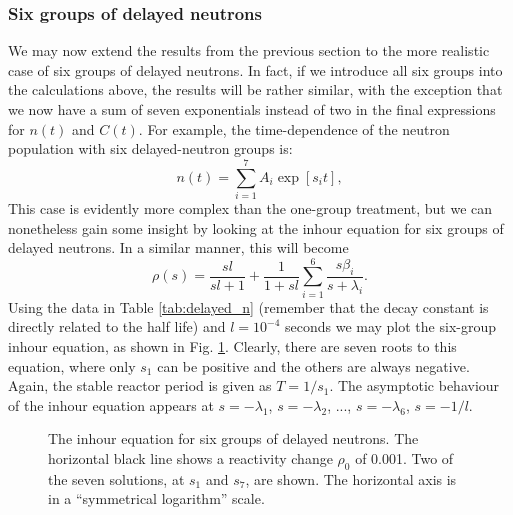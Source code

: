 \subsubsection*{Six groups of delayed neutrons}
We may now extend the results from the previous section to the more realistic case of six groups of delayed neutrons. In fact, if we introduce all six groups into the calculations above, the results will be rather similar, with the exception that we now have a sum of seven exponentials instead of two in the final expressions for $n(t)$ and $C(t)$. For example, the time-dependence of the neutron population with six delayed-neutron groups is:
\begin{equation}
	n(t) = \sum_{i=1}^7 A_i \exp[s_i t],
	\label{eq:n_delayed_sum}
\end{equation}
This case is evidently more complex than the one-group treatment, but we can nonetheless gain some insight by looking at the inhour equation for six groups of delayed neutrons. In a similar manner, this will become
\begin{equation}
	\rho(s) = \frac{sl}{sl + 1} + \frac{1}{1 + sl}\sum_{i=1}^6 \frac{s\beta_i}{s+\lambda_i}.
\end{equation}
Using the data in Table \ref{tab:delayed_n} (remember that the decay constant is directly related to the half life) and $l = 10^{-4}$ seconds we may plot the six-group inhour equation, as shown in Fig. \ref{fig:inhour_six_group}. Clearly, there are seven roots to this equation, where only $s_1$ can be positive and the others are always negative. Again, the stable reactor period is given as $T = 1/s_1$. The asymptotic behaviour of the inhour equation appears at $s = -\lambda_1$, $s = -\lambda_2$, ..., $s = -\lambda_6$, $s = -1/l$.
\begin{figure}[ht!]
\protect {}\protect
\caption{\label{fig:inhour_six_group} \footnotesize{The inhour equation for six groups of delayed neutrons. The horizontal black line shows a reactivity change $\rho_0$ of 0.001. Two of the seven solutions, at $s_1$ and $s_7$, are shown. The horizontal axis is in a ``symmetrical logarithm'' scale.}}
\end{figure}

